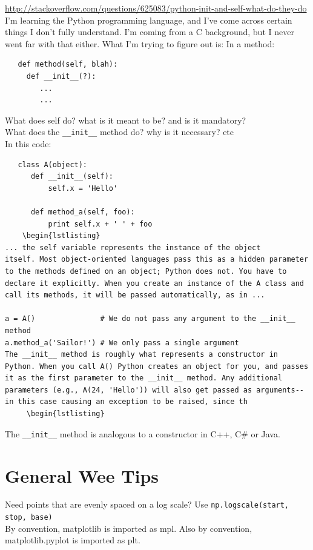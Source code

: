 \documentclass[11pt,a4paper]{article}
\begin{document}
    \href{http://stackoverflow.com/questions/625083/python-init-and-self-what-do-they-do}{http://stackoverflow.com/questions/625083/python-init-and-self-what-do-they-do}\\
   I'm learning the Python programming language, and I've come across
    certain things I don't fully understand. I'm coming from a C
    background, but I never went far with that either.
    What I'm trying to figure out is:
    In a method:
    \begin{lstlisting}
   def method(self, blah):
     def __init__(?):
        ...
        ...
  \end{lstlisting}
    What does self do? what is it meant to be? and is it mandatory?\\
    What does the {\tt \_\_init\_\_} method do? why is it necessary? etc\\

    
    In this code:
    \begin{lstlisting}
   class A(object):
      def __init__(self):
          self.x = 'Hello'

      def method_a(self, foo):
          print self.x + ' ' + foo
    \begin{lstlisting}
... the self variable represents the instance of the object
itself. Most object-oriented languages pass this as a hidden parameter
to the methods defined on an object; Python does not. You have to
declare it explicitly. When you create an instance of the A class and
call its methods, it will be passed automatically, as in ...

a = A()               # We do not pass any argument to the __init__ method
a.method_a('Sailor!') # We only pass a single argument
The __init__ method is roughly what represents a constructor in Python. When you call A() Python creates an object for you, and passes it as the first parameter to the __init__ method. Any additional parameters (e.g., A(24, 'Hello')) will also get passed as arguments--in this case causing an exception to be raised, since th
     \begin{lstlisting}
  \end{lstlisting}


The {\tt \_\_init\_\_} method is analogous to a constructor in C++, C\#
or Java.




 
\newpage
\section{General Wee Tips}
Need points that are evenly spaced on a log scale? Use {\tt np.logscale(start, stop, base)} \\
By convention, matplotlib is imported as mpl. Also by convention, matplotlib.pyplot is imported as plt.\\
\end{document}
